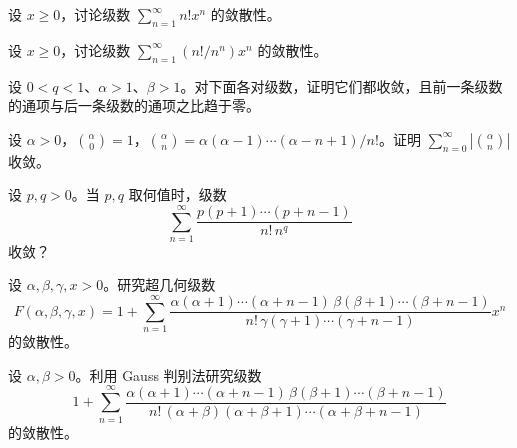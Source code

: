 \newpage
\noindent\begin{minipage}{\textwidth}
设 $x\ge0$，讨论级数 $\sum_{n=1}^{\infty}n!x^n$ 的敛散性。
\end{minipage}\par\vfill
\noindent\begin{minipage}{\textwidth}
设 $x\ge0$，讨论级数 $\sum_{n=1}^{\infty}(n!/n^n)x^n$ 的敛散性。
\end{minipage}\par\vfill
\noindent\begin{minipage}{\textwidth}
设 $0<q<1$、$\alpha>1$、$\beta>1$。对下面各对级数，证明它们都收敛，且前一条级数的通项与后一条级数的通项之比趋于零。
\end{minipage}\par\vfill
\newpage
\noindent\begin{minipage}{\textwidth}
设 $\alpha>0$，$\binom\alpha0=1$，$\binom\alpha n=\alpha(\alpha-1)\cdots(\alpha-n+1)/n!$。证明 $\sum_{n=0}^{\infty}|\binom\alpha n|$ 收敛。
\end{minipage}\par\vfill
\noindent\begin{minipage}{\textwidth}
设 $p,q>0$。当 $p,q$ 取何值时，级数\[\sum_{n=1}^{\infty}\frac{p(p+1)\cdots(p+n-1)}{n!\,n^q}\]收敛？
\end{minipage}\par\vfill
\noindent\begin{minipage}{\textwidth}
设 $\alpha,\beta,\gamma,x>0$。研究超几何级数\[F(\alpha,\beta,\gamma,x)=1+\sum_{n=1}^{\infty}\frac{\alpha(\alpha+1)\cdots(\alpha+n-1)\,\beta(\beta+1)\cdots(\beta+n-1)}{n!\,\gamma(\gamma+1)\cdots(\gamma+n-1)}x^n\]的敛散性。
\end{minipage}\par\vfill
\newpage
\noindent\begin{minipage}{\textwidth}
设 $\alpha,\beta>0$。利用 Gauss 判别法研究级数\[1+\sum_{n=1}^{\infty}\frac{\alpha(\alpha+1)\cdots(\alpha+n-1)\,\beta(\beta+1)\cdots(\beta+n-1)}{n!\,(\alpha+\beta)(\alpha+\beta+1)\cdots(\alpha+\beta+n-1)}\]的敛散性。
\end{minipage}\par\vfill
